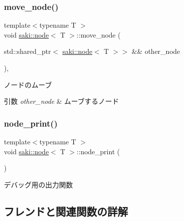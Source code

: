 \subsubsection{\texorpdfstring{move\+\_\+node()}{move\_node()}}
{\footnotesize\ttfamily template$<$typename T $>$ \\
void \mbox{\hyperlink{classsaki_1_1node}{saki\+::node}}$<$ T $>$\+::move\+\_\+node (\begin{DoxyParamCaption}\item[{std\+::shared\+\_\+ptr$<$ \mbox{\hyperlink{classsaki_1_1node}{saki\+::node}}$<$ T $>$$>$ \&\&}]{other\+\_\+node }\end{DoxyParamCaption})\hspace{0.3cm}{\ttfamily [inline]}, {\ttfamily [noexcept]}}



ノードのムーブ 


\begin{DoxyParams}{引数}
{\em other\+\_\+node} & ムーブするノード \\
\hline
\end{DoxyParams}
\mbox{\label{classsaki_1_1node_acb9989adf40b835001b33f7c190e96bd}} 
\subsubsection{\texorpdfstring{node\+\_\+print()}{node\_print()}}
{\footnotesize\ttfamily template$<$typename T $>$ \\
void \mbox{\hyperlink{classsaki_1_1node}{saki\+::node}}$<$ T $>$\+::node\+\_\+print (\begin{DoxyParamCaption}{ }\end{DoxyParamCaption})\hspace{0.3cm}{\ttfamily [inline]}}



デバッグ用の出力関数 



\subsection{フレンドと関連関数の詳解}
\mbox{\label{classsaki_1_1node_a151ca71f2c751d8a163f3f99ccf6cec9}} 
